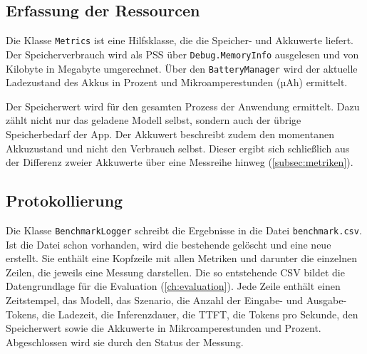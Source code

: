 \subsection{Erfassung der Ressourcen} Die Klasse \texttt{Metrics} ist eine Hilfsklasse, die die Speicher- und Akkuwerte liefert. Der Speicherverbrauch wird als \ac{PSS} über \texttt{Debug.MemoryInfo} ausgelesen und von Kilobyte in Megabyte umgerechnet. Über den \texttt{BatteryManager} wird der aktuelle Ladezustand des Akkus in Prozent und Mikroamperestunden (µAh) ermittelt.
\vspace{\baselineskip}

\noindent Der Speicherwert wird für den gesamten Prozess der Anwendung ermittelt. Dazu zählt nicht nur das geladene Modell selbst, sondern auch der übrige Speicherbedarf der App. Der Akkuwert beschreibt zudem den momentanen Akkuzustand und nicht den Verbrauch selbst. Dieser ergibt sich schließlich aus der Differenz zweier Akkuwerte über eine Messreihe hinweg (\autoref{subsec:metriken}).

\subsection{Protokollierung} Die Klasse \texttt{BenchmarkLogger} schreibt die Ergebnisse in die Datei \texttt{benchmark.csv}. Ist die Datei schon vorhanden, wird die bestehende gelöscht und eine neue erstellt. Sie enthält eine Kopfzeile mit allen Metriken und darunter die einzelnen Zeilen, die jeweils eine Messung darstellen. Die so entstehende \ac{CSV} bildet die Datengrundlage für die Evaluation (\autoref{ch:evaluation}).
\vspace{\baselineskip}
\noindent Jede Zeile enthält einen Zeitstempel, das Modell, das Szenario, die Anzahl der Eingabe- und Ausgabe-Tokens, die Ladezeit, die Inferenzdauer, die \ac{TTFT}, die Tokens pro Sekunde, den Speicherwert sowie die Akkuwerte in Mikroamperestunden und Prozent. Abgeschlossen wird sie durch den Status der Messung.